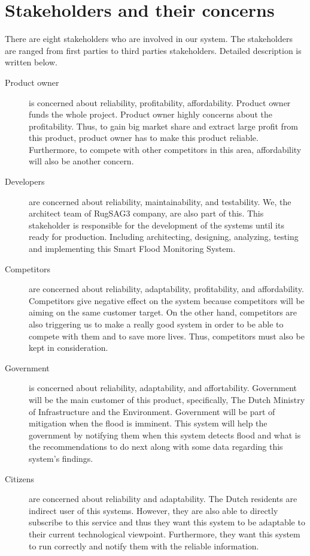 \section{Stakeholders and their concerns}


There are eight stakeholders who are involved in our system. The stakeholders are ranged from first parties to third parties stakeholders. Detailed description is written below.

\begin{description}
\item[Product owner] is concerned about reliability, profitability, affordability. Product owner funds the whole project. Product owner highly concerns about the profitability. Thus, to gain big market share and extract large profit from this product, product owner has to make this product reliable. Furthermore, to compete with other competitors in this area, affordability will also be another concern.
\item[Developers] are concerned about reliability, maintainability, and testability. We, the architect team of RugSAG3 company, are also part of this. This stakeholder is responsible for the development of the systems until its ready for production. Including architecting, designing, analyzing, testing and implementing this Smart Flood Monitoring System.
\item[Competitors] are concerned about reliability, adaptability, profitability, and affordability. Competitors give negative effect on the system because competitors will be aiming on the same customer target. On the other hand, competitors are also triggering us to make a really good system in order to be able to compete with them and to save more lives. Thus, competitors must also be kept in consideration.
\item[Government] is concerned about reliability, adaptability, and affortability. Government will be the main customer of this product, specifically, The Dutch Ministry of Infrastructure and the Environment. Government will be part of mitigation when the flood is imminent. This system will help the government by notifying them when this system detects flood and what is the recommendations to do next along with some data regarding this system's findings.
\item[Citizens] are concerned about reliability and adaptability. The Dutch residents are indirect user of this systems. However, they are also able to directly subscribe to this service and thus they want this system to be adaptable to their current technological viewpoint. Furthermore, they want this system to run correctly and notify them with the reliable information.

\end{description}
